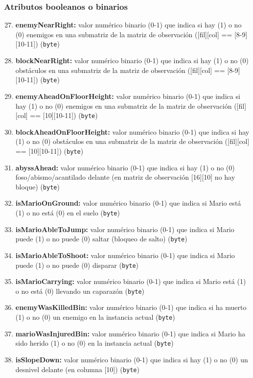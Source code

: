 \documentclass[10pt, spanish, pdftex]{../.template/template}
\begin{document}
    \subsubsection{Atributos booleanos o binarios}
    \begin{enumerate}
        \setcounter{enumi}{26}
        \item \textbf{enemyNearRight:} valor numérico binario (0-1) que indica si hay (1) o no (0) enemigos en una submatriz de la matriz de observación ([fil][col] == [8-9][10-11]) (\texttt{byte})
        \item \textbf{blockNearRight:} valor numérico binario (0-1) que indica si hay (1) o no (0) obstáculos en una submatriz de la matriz de observación ([fil][col] == [8-9][10-11]) (\texttt{byte})
        \item \textbf{enemyAheadOnFloorHeight:} valor numérico binario (0-1) que indica si hay (1) o no (0) enemigos en una submatriz de la matriz de observación ([fil][col] == [10][10-11]) (\texttt{byte})
        \item \textbf{blockAheadOnFloorHeight:} valor numérico binario (0-1) que indica si hay (1) o no (0) obstáculos en una submatriz de la matriz de observación ([fil][col] == [10][10-11]) (\texttt{byte})
        \item \textbf{abyssAhead:} valor numérico binario (0-1) que indica si hay (1) o no (0) foso/abismo/acantilado delante (en matriz de observación [16][10] no hay bloque) (\texttt{byte})
        \item \textbf{isMarioOnGround:} valor numérico binario (0-1) que indica si Mario está (1) o no está (0) en el suelo (\texttt{byte})
        \item \textbf{isMarioAbleToJump:} valor numérico binario (0-1) que indica si Mario puede (1) o no puede (0) saltar (bloqueo de salto) (\texttt{byte})
        \item \textbf{isMarioAbleToShoot:} valor numérico binario (0-1) que indica si Mario puede (1) o no puede (0) disparar (\texttt{byte})
        \item \textbf{isMarioCarrying:} valor numérico binario (0-1) que indica si Mario está (1) o no está (0) llevando un caparazón (\texttt{byte})
        \item \textbf{enemyWasKilledBin:} valor numérico binario (0-1) que indica si ha muerto (1) o no (0) un enemigo en la instancia actual (\texttt{byte})
        \item \textbf{marioWasInjuredBin:} valor numérico binario (0-1) que indica si Mario ha sido herido (1) o no (0) en la instancia actual (\texttt{byte})
        \item \textbf{isSlopeDown:} valor numérico binario (0-1) que indica si hay (1) o no (0) un desnivel delante (en columna [10]) (\texttt{byte})
    \end{enumerate}
\end{document}
